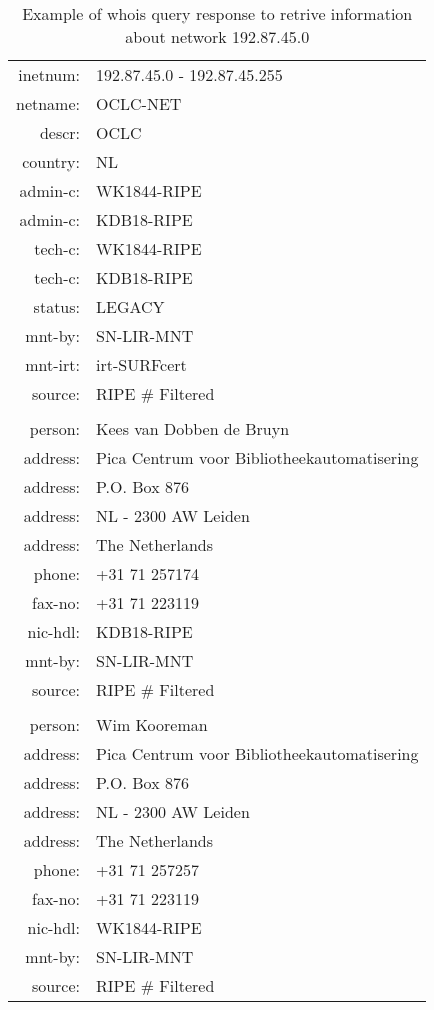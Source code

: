 \documentclass[11pt,a4paper]{scrreprt}
\begin{document}
\begin{appendices}
\begin{table}[!h]
\begin{tabular}{  r  l  }
 inetnum:  & 	192.87.45.0 - 192.87.45.255 \\
 netname:  & 	OCLC-NET \\
 descr:    &	OCLC \\
 country:  & 	NL \\
 admin-c:  & 	WK1844-RIPE \\
 admin-c:  & 	KDB18-RIPE \\
 tech-c:   & 	WK1844-RIPE \\
 tech-c:   & 	KDB18-RIPE \\
 status:   & 	LEGACY \\
 mnt-by:   & 	SN-LIR-MNT \\
 mnt-irt:  & 	irt-SURFcert \\
 source:   & 	RIPE \# Filtered \\
 \\
 person:   & 	Kees van Dobben de Bruyn \\
 address:  & 	Pica Centrum voor Bibliotheekautomatisering \\
 address:  & 	P.O. Box 876 \\
 address:  & 	NL - 2300 AW Leiden \\
 address:  & 	The Netherlands \\
 phone:    & 	+31 71 257174 \\
 fax-no:   & 	+31 71 223119 \\
 nic-hdl:  & 	KDB18-RIPE \\
 mnt-by:   &  	SN-LIR-MNT   \\
 source:   & 	RIPE \# Filtered \\
 \\
 person:   &    Wim Kooreman\\
 address:  &    Pica Centrum voor Bibliotheekautomatisering\\
 address:  &    P.O. Box 876\\
 address:  &    NL - 2300 AW Leiden\\
 address:  &    The Netherlands\\
 phone:    &    +31 71 257257\\
 fax-no:   &    +31 71 223119\\
 nic-hdl:  &    WK1844-RIPE\\
 mnt-by:   &    SN-LIR-MNT\\
 source:   &    RIPE \# Filtered\\
 
\end{tabular}
\caption{Example of whois query response to retrive information about network 192.87.45.0}
\label{table:2}
\end{table}     
        

\end{appendices}
\end{document}
